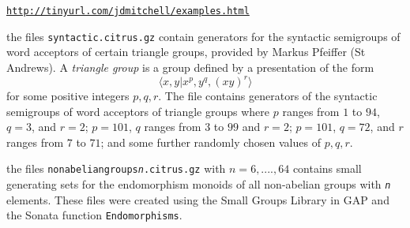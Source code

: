 \documentclass[a4paper,11pt]{report}
\begin{document}
{{\begin{description}
 \href{http://tinyurl.com/jdmitchell/examples.html} {\texttt{http://tinyurl.com/jdmitchell/examples.html}} 
\item[{Syntactic semigroups}]  the files \texttt{syntactic.citrus.gz} contain generators for the syntactic semigroups of word acceptors of certain
triangle groups, provided by Markus Pfeiffer (St Andrews). A \emph{triangle group} is a group defined by a presentation of the form 
\[ \langle x, y | x^p, y^q, (xy)^r\rangle \]
 for some positive integers $p, q, r$. The file contains generators of the syntactic semigroups of word acceptors
of triangle groups where $p$ ranges from $1$ to $94$, $q=3$, and $r=2$; $p=101$, $q$ ranges from $3$ to $99$ and $r=2$; $p=101$, $q=72$, and $r$ ranges from $7$ to $71$; and some further randomly chosen values of $p,q,r$. 
\item[{Endomorphisms of groups}]  the files \texttt{nonabelian{\textunderscore}groups{\textunderscore}\mbox{\texttt{\mdseries\slshape n}}.citrus.gz} with $n=6,....,64$ contains small generating sets for the endomorphism monoids of all non-abelian
groups with \mbox{\texttt{\mdseries\slshape n}} elements. These files were created using the Small Groups Library in \textsf{GAP} and the \textsf{Sonata} function \texttt{Endomorphisms}. 
\end{description}
 }

 }

 
\end{document}
